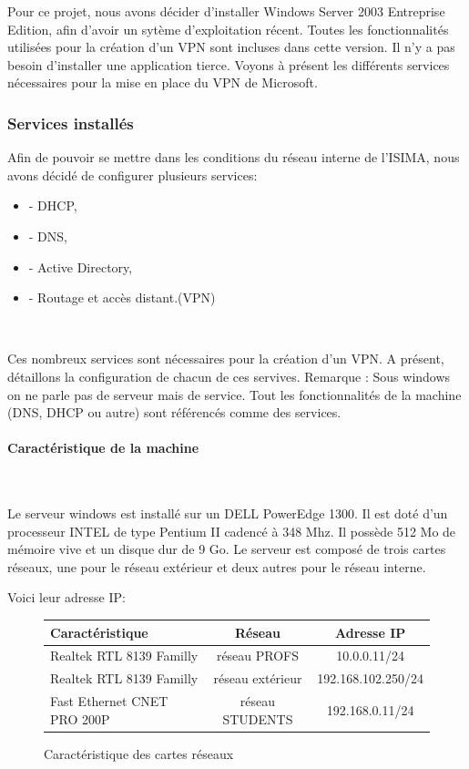 	Pour ce projet, nous avons décider d'installer Windows Server 2003 Entreprise Edition, afin d'avoir un sytème d'exploitation récent. Toutes les fonctionnalités utilisées pour la création d'un VPN sont incluses dans cette version. Il n'y a pas besoin d'installer une application tierce.
	Voyons à présent les différents services nécessaires pour la mise en place du VPN de Microsoft.

\subsubsection{Services installés}

	Afin de pouvoir se mettre dans les conditions du réseau interne de l'ISIMA, nous avons décidé de configurer plusieurs services:
~


\begin{itemize}
	\item  - DHCP,
	\item  - DNS, 
	\item  - Active Directory,
	\item  - Routage et accès distant.(VPN)
\end{itemize}
~	

	Ces nombreux services sont nécessaires pour la création d'un VPN. A présent, détaillons la configuration de chacun de ces servives. 
	Remarque : Sous windows on ne parle pas de serveur mais de service. Tout les fonctionnalités de la machine (DNS, DHCP ou autre) sont référencés comme des services.


\paragraph{Caractéristique de la machine}
~\

Le serveur windows est installé sur un DELL PowerEdge 1300. Il est doté d'un processeur INTEL de type Pentium II cadencé à 348 Mhz. Il possède 512 Mo de mémoire vive et un disque dur de 9 Go.
Le serveur est composé de trois cartes réseaux, une pour le réseau extérieur et deux autres pour le réseau interne. 



Voici leur adresse IP:

\begin{figure}[H]
	\begin{center}
\begin{tabular}{|l|c|c|}
\hline
Caractéristique & Réseau & Adresse IP \\
\hline
Realtek RTL 8139 Familly & réseau PROFS & 10.0.0.11/24 \\
Realtek RTL 8139 Familly & réseau extérieur & 192.168.102.250/24 \\
Fast Ethernet CNET PRO 200P & réseau STUDENTS & 192.168.0.11/24 \\
\hline
\end{tabular}
	\end{center}
	\caption{Caractéristique des cartes réseaux}
	\label{IP_carte_reseau}
\end{figure}

